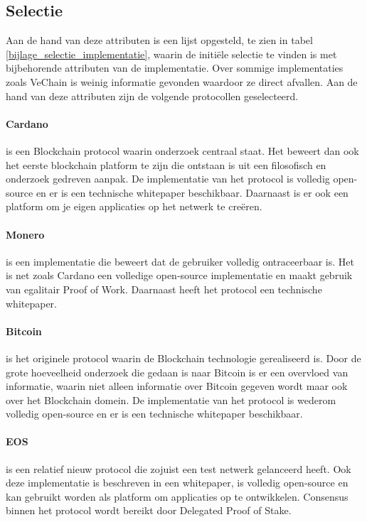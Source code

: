 \newpage
\subsection{Selectie}

Aan de hand van deze attributen is een lijst opgesteld, te zien in tabel \ref{bijlage_selectie_implementatie}, waarin de initiële selectie te vinden is met bijbehorende attributen van de implementatie. Over sommige implementaties zoals VeChain is weinig informatie gevonden waardoor ze direct afvallen. Aan de hand van deze attributen zijn de volgende protocollen geselecteerd.

\paragraph{Cardano} is een Blockchain protocol waarin onderzoek centraal staat. Het beweert dan ook het eerste blockchain platform te zijn die ontstaan is uit een filosofisch en onderzoek gedreven aanpak. De implementatie van het protocol is volledig open-source en er is een technische whitepaper beschikbaar. Daarnaast is er ook een platform om je eigen applicaties op het netwerk te creëren.

\paragraph{Monero} is een implementatie die beweert dat de gebruiker volledig ontraceerbaar is. Het is net zoals Cardano een volledige open-source implementatie en maakt gebruik van egalitair Proof of Work. Daarnaast heeft het protocol een technische whitepaper. 

\paragraph{Bitcoin} is het originele protocol waarin de Blockchain technologie gerealiseerd is. Door de grote hoeveelheid onderzoek die gedaan is naar Bitcoin is er een overvloed van informatie, waarin niet alleen informatie over Bitcoin gegeven wordt maar ook over het Blockchain domein. De implementatie van het protocol is wederom volledig open-source en er is een technische whitepaper beschikbaar.

\paragraph{EOS} is een relatief nieuw protocol die zojuist een test netwerk gelanceerd heeft. Ook deze implementatie is beschreven in een whitepaper, is volledig open-source en kan gebruikt worden als platform om applicaties op te ontwikkelen. Consensus binnen het protocol wordt bereikt door Delegated Proof of Stake.
